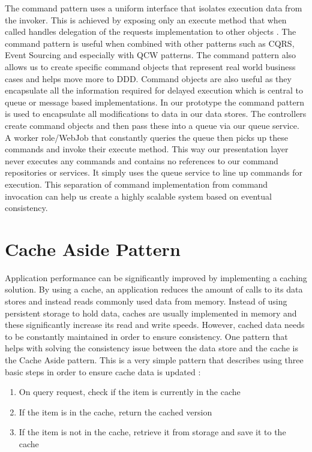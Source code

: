  The command pattern uses a uniform interface that isolates execution data from the invoker. This is achieved by exposing only an execute method that when called handles delegation of the requests implementation to other objects \cite{Gamma1994-ho}. The command pattern is useful when combined with other patterns such as CQRS, Event Sourcing and especially with QCW patterns. The command pattern also allows us to create specific command objects that represent real world business cases and helps move more to DDD. Command objects are also useful as they encapsulate all the information required for delayed execution \cite{Gamma1994-ho} which is central to queue or message based implementations. In our prototype the command pattern is used to encapsulate all modifications to data in our data stores. The controllers create command objects and then pass these into a queue via our queue service. A worker role/WebJob that constantly queries the queue then picks up these commands and invoke their execute method. This way our presentation layer never executes any commands and contains no references to our command repositories or services. It simply uses the queue service to line up commands for execution. This separation of command implementation from command invocation can help us create a highly scalable system based on eventual consistency.
 
 
 \section{Cache Aside Pattern}
  \label{sec:cache}
 Application performance can be significantly improved by implementing a caching solution. By using a cache, an application reduces the amount of calls to its data stores and instead reads commonly used data from memory. Instead of using persistent storage to hold data, caches are usually implemented in memory and these significantly increase its read and write speeds. However, cached data needs to be constantly maintained in order to ensure consistency. One pattern that helps with solving the consistency issue between the data store and the cache is the Cache Aside pattern. This is a very simple pattern that describes using three basic steps in order to ensure cache data is updated \cite{Homer2014}:
 
    \begin{enumerate}
        \item On query request, check if the item is currently in the cache
        \item If the item is in the cache, return the cached version
        \item If the item is not in the cache, retrieve it from storage and save it to the cache
   \end{enumerate}
   
